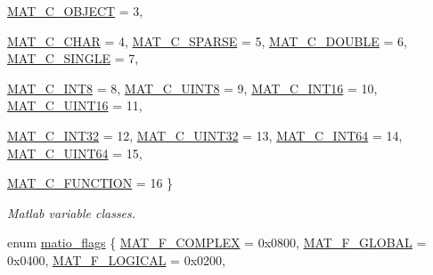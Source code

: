 \begin{DoxyCompactItemize}
\hyperlink{group__MAT_ggad4d60ae7b709fc81bfd744fb4c857c40afe45104b68b044c83a2f99e349fa1ea6}{MAT\_\-C\_\-OBJECT} =  3, 
\par
\hyperlink{group__MAT_ggad4d60ae7b709fc81bfd744fb4c857c40aacdec5834df0861130b393697646119c}{MAT\_\-C\_\-CHAR} =  4, 
\hyperlink{group__MAT_ggad4d60ae7b709fc81bfd744fb4c857c40a0d5655b7e6178a2242cb3bb56ff4c8d2}{MAT\_\-C\_\-SPARSE} =  5, 
\hyperlink{group__MAT_ggad4d60ae7b709fc81bfd744fb4c857c40a5d70e0862e5bdb7bd86bf7ba5948f307}{MAT\_\-C\_\-DOUBLE} =  6, 
\hyperlink{group__MAT_ggad4d60ae7b709fc81bfd744fb4c857c40a2825631e26a961cbe0f79db50a39cea2}{MAT\_\-C\_\-SINGLE} =  7, 
\par
\hyperlink{group__MAT_ggad4d60ae7b709fc81bfd744fb4c857c40a984ff310f9e906100fcff95f704f43c5}{MAT\_\-C\_\-INT8} =  8, 
\hyperlink{group__MAT_ggad4d60ae7b709fc81bfd744fb4c857c40a81270f8093cb4808e992c1d29d84d4e3}{MAT\_\-C\_\-UINT8} =  9, 
\hyperlink{group__MAT_ggad4d60ae7b709fc81bfd744fb4c857c40a40370e9de516c5036a67a5865c071006}{MAT\_\-C\_\-INT16} =  10, 
\hyperlink{group__MAT_ggad4d60ae7b709fc81bfd744fb4c857c40a8bede21dbf6c1edc0bbccc1481bccae7}{MAT\_\-C\_\-UINT16} =  11, 
\par
\hyperlink{group__MAT_ggad4d60ae7b709fc81bfd744fb4c857c40adb44fc39694e3152ae5e69470a2fefe8}{MAT\_\-C\_\-INT32} =  12, 
\hyperlink{group__MAT_ggad4d60ae7b709fc81bfd744fb4c857c40a9a17a7edd45b19ef68197db81b27e816}{MAT\_\-C\_\-UINT32} =  13, 
\hyperlink{group__MAT_ggad4d60ae7b709fc81bfd744fb4c857c40a1ea83bcde49b35477494412973f82409}{MAT\_\-C\_\-INT64} =  14, 
\hyperlink{group__MAT_ggad4d60ae7b709fc81bfd744fb4c857c40a86470e25c3763d9a24623f04326195dd}{MAT\_\-C\_\-UINT64} =  15, 
\par
\hyperlink{group__MAT_ggad4d60ae7b709fc81bfd744fb4c857c40aaa9bf08312779cd1ab8e504a162ddcea}{MAT\_\-C\_\-FUNCTION} =  16
 \}
\begin{DoxyCompactList}\small\item\em Matlab variable classes. \item\end{DoxyCompactList}\item 
enum \hyperlink{group__MAT_gab9d6ef9e3ddca78a317b173f01d53fbb}{matio\_\-flags} \{ \hyperlink{group__MAT_ggab9d6ef9e3ddca78a317b173f01d53fbbacd7b091a11184aad7fc6078c04470780}{MAT\_\-F\_\-COMPLEX} =  0x0800, 
\hyperlink{group__MAT_ggab9d6ef9e3ddca78a317b173f01d53fbba49084e0c796aa7963e53f7539525d40d}{MAT\_\-F\_\-GLOBAL} =  0x0400, 
\hyperlink{group__MAT_ggab9d6ef9e3ddca78a317b173f01d53fbba57eb5c6e200bcbc0f1b7982f29a169c2}{MAT\_\-F\_\-LOGICAL} =  0x0200, 

\end{DoxyCompactItemize}
